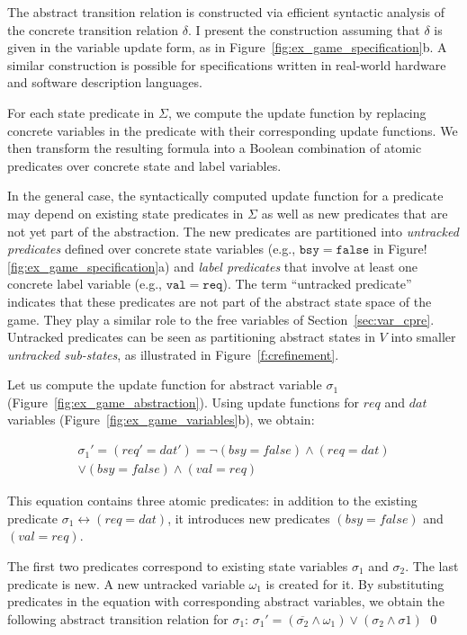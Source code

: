 The abstract transition relation is constructed via efficient syntactic analysis of the concrete transition relation $\delta$. I present the construction assuming that $\delta$ is given in the variable update form, as in Figure~\ref{fig:ex_game_specification}b. A similar construction is possible for specifications written in real-world hardware and software description languages.

For each state predicate in $\Sigma$, we compute the update function by replacing concrete variables in the predicate with their corresponding update functions. We then transform the resulting formula into a Boolean combination of atomic predicates over concrete state and label variables.

In the general case, the syntactically computed update function for a predicate may depend on existing state predicates in $\Sigma$ as well as new predicates that are not yet part of the abstraction.  The new predicates are partitioned into \emph{untracked predicates} defined over concrete state variables (e.g., $\mathtt{bsy=false}$ in Figure!\ref{fig:ex_game_specification}a) and \emph{label predicates} that involve at least one concrete label variable (e.g., $\mathtt{val=req}$).  The term ``untracked predicate'' indicates that these predicates are not part of the abstract state space of the game. They play a similar role to the free variables of Section~\ref{sec:var_cpre}. Untracked predicates can be seen as partitioning abstract states in $V$ into smaller \emph{untracked sub-states}, as illustrated in Figure~\ref{f:crefinement}.

\begin{ex}
    Let us compute the update function for abstract variable $\sigma_1$ (Figure~\ref{fig:ex_game_abstraction}).  Using update functions for $req$ and $dat$ variables (Figure~\ref{fig:ex_game_variables}b), we obtain: 
    
    \begin{multline}
    \sigma_1' = (req' = dat') = \neg(bsy = false) \land (req=dat) \\ \lor (bsy=false) \land (val=req)
    \end{multline}
    
    \noindent This equation contains three atomic predicates: in addition to the existing predicate $\sigma_1 \leftrightarrow (req=dat)$, it introduces new predicates $(bsy=false)$ and $(val=req)$.  

    The first two predicates correspond to existing state variables $\sigma_1$ and $\sigma_2$.  The last predicate is new. A new untracked variable $\omega_1$ is created for it.  By substituting predicates in the equation with corresponding abstract variables, we obtain the following abstract transition relation for $\sigma_1$:
    $\sigma_1' = (\overline{\sigma_2} \land \omega_1) \lor (\sigma_2 \land \sigma1)$
    \qed
\end{ex}

